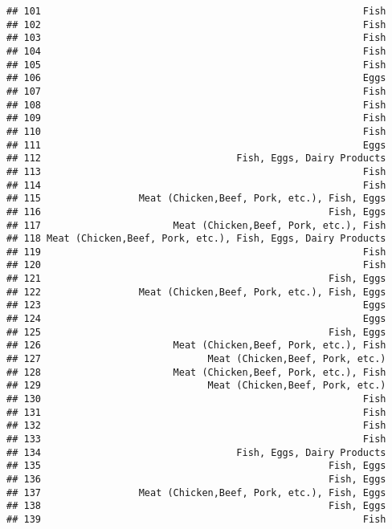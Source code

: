 \documentclass[
]{article}
\begin{document}
\begin{verbatim}
## 101                                                        Fish
## 102                                                        Fish
## 103                                                        Fish
## 104                                                        Fish
## 105                                                        Fish
## 106                                                        Eggs
## 107                                                        Fish
## 108                                                        Fish
## 109                                                        Fish
## 110                                                        Fish
## 111                                                        Eggs
## 112                                  Fish, Eggs, Dairy Products
## 113                                                        Fish
## 114                                                        Fish
## 115                 Meat (Chicken,Beef, Pork, etc.), Fish, Eggs
## 116                                                  Fish, Eggs
## 117                       Meat (Chicken,Beef, Pork, etc.), Fish
## 118 Meat (Chicken,Beef, Pork, etc.), Fish, Eggs, Dairy Products
## 119                                                        Fish
## 120                                                        Fish
## 121                                                  Fish, Eggs
## 122                 Meat (Chicken,Beef, Pork, etc.), Fish, Eggs
## 123                                                        Eggs
## 124                                                        Eggs
## 125                                                  Fish, Eggs
## 126                       Meat (Chicken,Beef, Pork, etc.), Fish
## 127                             Meat (Chicken,Beef, Pork, etc.)
## 128                       Meat (Chicken,Beef, Pork, etc.), Fish
## 129                             Meat (Chicken,Beef, Pork, etc.)
## 130                                                        Fish
## 131                                                        Fish
## 132                                                        Fish
## 133                                                        Fish
## 134                                  Fish, Eggs, Dairy Products
## 135                                                  Fish, Eggs
## 136                                                  Fish, Eggs
## 137                 Meat (Chicken,Beef, Pork, etc.), Fish, Eggs
## 138                                                  Fish, Eggs
## 139                                                        Fish

\end{verbatim}
\end{document}
